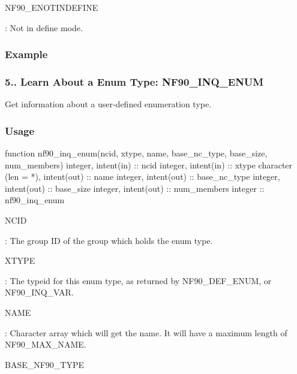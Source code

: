 {\ttfamily N\+F90\+\_\+\+E\+N\+O\+T\+I\+N\+D\+E\+F\+I\+NE}

\+: Not in define mode.

\subsubsection*{Example}\hypertarget{f90-user-defined-data-types_f90-learn-about-a-enum-type-nf90_inq_enum}{}\subsubsection{5.. Learn About a Enum Type\+: N\+F90\+\_\+\+I\+N\+Q\+\_\+\+E\+N\+UM}\label{f90-user-defined-data-types_f90-learn-about-a-enum-type-nf90_inq_enum}
Get information about a user-\/defined enumeration type.

\subsubsection*{Usage}


\begin{DoxyCode}
\textcolor{keyword}{function }nf90\_inq\_enum(ncid, xtype, name, base\_nc\_type, base\_size, num\_members)
  \textcolor{keywordtype}{integer}, \textcolor{keywordtype}{intent(in)} :: ncid
  \textcolor{keywordtype}{integer}, \textcolor{keywordtype}{intent(in)} :: xtype
  \textcolor{keywordtype}{character (len = *)}, \textcolor{keywordtype}{intent(out)} :: name
  \textcolor{keywordtype}{integer}, \textcolor{keywordtype}{intent(out)} :: base\_nc\_type
  \textcolor{keywordtype}{integer}, \textcolor{keywordtype}{intent(out)} :: base\_size
  \textcolor{keywordtype}{integer}, \textcolor{keywordtype}{intent(out)} :: num\_members
  \textcolor{keywordtype}{integer} :: nf90\_inq\_enum
\end{DoxyCode}


{\ttfamily N\+C\+ID}

\+: The group ID of the group which holds the enum type.

{\ttfamily X\+T\+Y\+PE}

\+: The typeid for this enum type, as returned by N\+F90\+\_\+\+D\+E\+F\+\_\+\+E\+N\+UM, or N\+F90\+\_\+\+I\+N\+Q\+\_\+\+V\+AR.

{\ttfamily N\+A\+ME}

\+: Character array which will get the name. It will have a maximum length of N\+F90\+\_\+\+M\+A\+X\+\_\+\+N\+A\+ME.

{\ttfamily B\+A\+S\+E\+\_\+\+N\+F90\+\_\+\+T\+Y\+PE}

